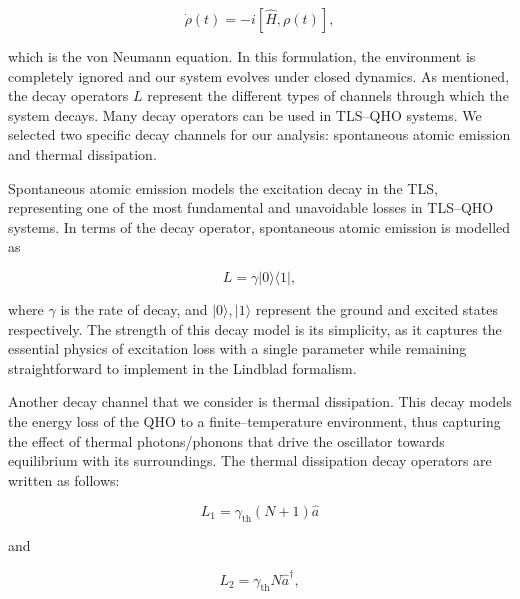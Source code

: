 \documentclass[11pt]{article}
\begin{document}
\begin{equation}
    \dot \rho(t) = - i[\hat{H}, \rho(t)],
\end{equation}

which is the von Neumann equation. In this formulation, the environment is completely ignored and our system evolves under closed dynamics. As mentioned, the decay operators $L$ represent the different types of channels through which the system decays. Many decay operators can be used in TLS--QHO systems. We selected two specific decay channels for our analysis: spontaneous atomic emission and thermal dissipation. 

Spontaneous atomic emission models the excitation decay in the TLS, representing one of the most fundamental and unavoidable losses in TLS--QHO systems. In terms of the decay operator, spontaneous atomic emission is modelled as

\begin{equation} \label{eqn:L_spont}
    L = \gamma|0\rangle\langle1|,
\end{equation}

where $\gamma$ is the rate of decay, and $|0\rangle,|1\rangle$ represent the ground and excited states respectively. The strength of this decay model is its simplicity, as it captures the essential physics of excitation loss with a single parameter while remaining straightforward to implement in the Lindblad formalism.

Another decay channel that we consider is thermal dissipation. This decay models the energy loss of the QHO to a finite--temperature environment, thus capturing the effect of thermal photons/phonons that drive the oscillator towards equilibrium with its surroundings. The thermal dissipation decay operators are written as follows:

\begin{equation}\label{eqn:L_therm}
    L_1 = \gamma_{\scriptscriptstyle \text{th}}(N+1)\hat{a} 
\end{equation}

and 

\begin{equation*}
    L_2 = \gamma_{\scriptscriptstyle \text{th}}N\hat{a}^\dagger ,
\end{equation*}
\end{document}
